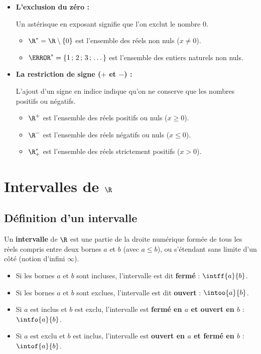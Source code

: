 \begin{remarque}
	\nline
	\begin{itemize}
		\item \textbf{L'exclusion du zéro :}

		      Un astérisque en exposant signifie que l'on exclut le nombre $0$.

		      \begin{itemize}
			      \item $\R^* = \R \setminus \{0\}$ est l'ensemble des réels non nuls ($x \neq 0$).
			      \item $\N^* = \{1\,;\, 2\,;\, 3\,;\, \dots\}$ est l'ensemble des entiers naturels non nuls.
		      \end{itemize}

		\item \textbf{La restriction de signe ($+$ et $-$) :}

		      L'ajout d'un signe en indice indique qu'on ne conserve que les nombres positifs ou négatifs.

		      \begin{itemize}
			      \item $\R^+$ est l'ensemble des réels positifs ou nuls ($x \geqslant 0$).
			      \item $\R^-$ est l'ensemble des réels négatifs ou nuls ($x \leqslant 0$).
			      \item $\R^*_+$ est l'ensemble des réels strictement positifs ($x > 0$).
		      \end{itemize}
	\end{itemize}
\end{remarque}

\section{Intervalles de $\R$}

\subsection{Définition d'un intervalle}

\begin{df}
	Un \textbf{intervalle} de $\R$ est une partie de la droite numérique formée de tous les réels compris entre deux bornes $a$ et $b$ (avec $a \leqslant b$), ou s'étendant sans limite d'un côté (notion d'infini $\infty$).

	\begin{itemize}
		\item Si les bornes $a$ et $b$ sont incluses, l'intervalle est dit \textbf{fermé} : $\intff{a}{b}$.
		\item Si les bornes $a$ et $b$ sont exclues, l'intervalle est dit \textbf{ouvert} : $\intoo{a}{b}$.
		\item Si $a$ est inclus et $b$ est exclu, l'intervalle est \textbf{fermé en $a$ et ouvert en $b$} : $\intfo{a}{b}$.
		\item Si $a$ est exclu et $b$ est inclus, l'intervalle est \textbf{ouvert en $a$ et fermé en $b$} : $\intof{a}{b}$.
	\end{itemize}
\end{df}


